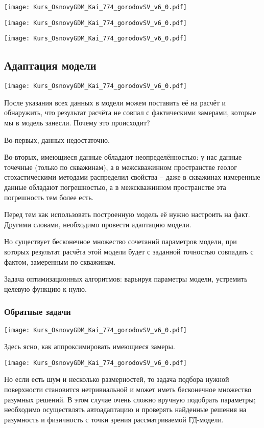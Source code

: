 \documentclass[main.tex]{subfiles}
\begin{document}
\texttt{[image: Kurs\_OsnovyGDM\_Kai\_774\_gorodovSV\_v6\_0.pdf]}

\texttt{[image: Kurs\_OsnovyGDM\_Kai\_774\_gorodovSV\_v6\_0.pdf]}

\texttt{[image: Kurs\_OsnovyGDM\_Kai\_774\_gorodovSV\_v6\_0.pdf]}

\subsection{Адаптация модели}

\texttt{[image: Kurs\_OsnovyGDM\_Kai\_774\_gorodovSV\_v6\_0.pdf]}

После указания всех данных в модели можем поставить её на расчёт и обнаружить, что результат расчёта не совпал с фактическими замерами, которые мы в модель занесли.
Почему это происходит?

Во-первых, данных недостаточно.

Во-вторых, имеющиеся данные обладают неопределённостью: у нас данные точечные (только по скважинам), а в межскважинном пространстве геолог стохастическими методами распределил свойства -- даже в скважинах измеренные данные обладают погрешностью, а в межскважинном пространстве эта погрешность тем более есть.

Перед тем как использовать построенную модель её нужно настроить на факт.
Другими словами, необходимо провести адаптацию модели.

Но существует бесконечное множество сочетаний параметров модели, при которых результат расчёта этой модели будет с заданной точностью совпадать с фактом, замеренным по скважинам.

Задача оптимизационных алгоритмов: варьируя параметры модели, устремить целевую функцию к нулю.

\subsubsection{Обратные задачи}

\texttt{[image: Kurs\_OsnovyGDM\_Kai\_774\_gorodovSV\_v6\_0.pdf]}

Здесь ясно, как аппроксимировать имеющиеся замеры.

\texttt{[image: Kurs\_OsnovyGDM\_Kai\_774\_gorodovSV\_v6\_0.pdf]}

Но если есть шум и несколько размерностей, то задача подбора нужной поверхности становится нетривиальной и может иметь бесконечное множество разумных решений.
В этом случае очень сложно вручную подобрать параметры; необходимо осуществлять автоадаптацию и проверять найденные решения на разумность и физичность с точки зрения рассматриваемой ГД-модели.
\end{document}
